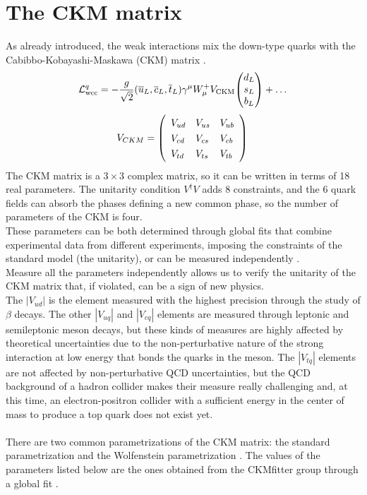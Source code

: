\section{The CKM matrix}\label{sec:CKM}
As already introduced, the weak interactions mix the down-type quarks with the Cabibbo-Kobayashi-Maskawa (CKM) matrix \cite{Cabibbo_angle,Kobayashi1973CP-ViolationInteraction}.
\begin{equation}
    \Lg{wcc}^q=-\frac{g}{\sqrt{2}}(\overline{{{u}}}_{L},\overline{{{c}}}_{L},\overline{{{t}}}_{L})\gamma^{\mu}W_{\mu}^{+}V_{\mathrm{CKM}}\tb{d_{L}}{s_{L}}{b_L}+\dots
\end{equation}
\begin{equation}
V_{C K M}=\left(\begin{array}{l l l}{{V_{u d}}}&{{V_{u s}}}&{{V_{u b}}}\\ {{V_{c d}}}&{{V_{c s}}}&{{V_{c b}}}\\ {{V_{t d}}}&{{V_{t s}}}&{{V_{t b}}}\end{array}\right)\,
\end{equation}
The CKM matrix is a $3 \times 3$ complex matrix, so it can be written in terms of 18 real parameters. The unitarity condition $V^\dagger V$ adds 8 constraints, and the 6 quark fields can absorb the phases defining a new common phase, so the number of parameters of the CKM is four.\\
These parameters can be  both determined through global fits that combine experimental data from different experiments, imposing the constraints of the standard model (\eg the unitarity), or can be measured independently \cite{PDG_2022}.\\
Measure all the parameters independently allows us to verify the unitarity of the CKM matrix that, if violated, can be a sign of new physics.\\
The $|V_{ud}|$ is the element measured with the highest precision through  the study of $\beta$ decays. The other $|V_{uq}|$ and $|V_{cq}|$ elements are measured through leptonic and semileptonic meson decays, but these kinds of measures are highly affected by theoretical uncertainties due to the non-perturbative nature of the strong interaction at low energy that bonds the quarks in the meson.
The $|V_{tq}|$ elements are not affected by non-perturbative QCD uncertainties, but the QCD background of a hadron collider makes their measure really challenging and, at this time, an electron-positron collider with a sufficient energy in the center of mass to produce a top quark does not exist yet.
\\
\\
There are two common parametrizations of the CKM matrix: the standard parametrization and the Wolfenstein parametrization \cite{PDG_2022}.
The values of the parameters listed below are the ones obtained from the CKMfitter group through a global fit \cite{Charles2005CPFactories,Hocker2001AMatrix,PDG_2022}.
